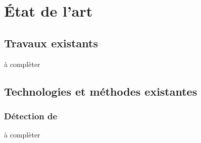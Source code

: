 \chapter{État de l'art}


\section{Travaux existants}
à complèter

\section{Technologies et méthodes existantes}
\subsection{Détection de }
à complèter